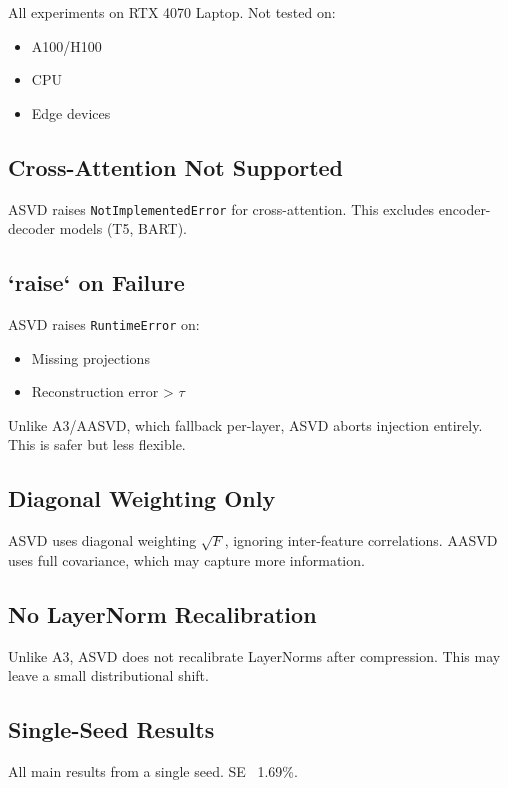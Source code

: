 All experiments on RTX 4070 Laptop. Not tested on:
\begin{itemize}
\item A100/H100
\item CPU
\item Edge devices

\end{itemize}
\subsection{Cross-Attention Not Supported}

ASVD raises \texttt{NotImplementedError} for cross-attention. This excludes 
encoder-decoder models (T5, BART).

\subsection{`raise` on Failure}

ASVD raises \texttt{RuntimeError} on:
\begin{itemize}
\item Missing projections
\item Reconstruction error > $\tau$

\end{itemize}
Unlike A3/AASVD, which fallback per-layer, ASVD aborts injection entirely. 
This is safer but less flexible.

\subsection{Diagonal Weighting Only}

ASVD uses diagonal weighting $\sqrt{F}$, ignoring inter-feature 
correlations. AASVD uses full covariance, which may capture more 
information.

\subsection{No LayerNorm Recalibration}

Unlike A3, ASVD does not recalibrate LayerNorms after compression. This 
may leave a small distributional shift.

\subsection{Single-Seed Results}

All main results from a single seed. SE ~1.69\%.

